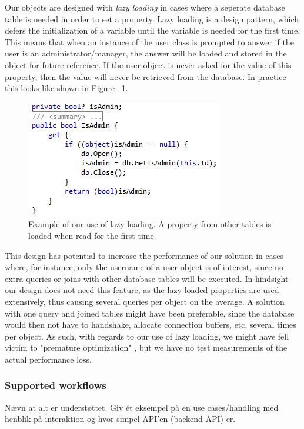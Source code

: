 Our objects are designed with \emph{lazy loading} in cases where a seperate database table is needed in order to set a property. Lazy loading is a design pattern, which defers the initialization of a variable until the variable is needed for the first time. This means that when an instance of the user class is prompted to answer if the user is an administrator/manager, the answer will be loaded and stored in the object for future reference. If the user object is never asked for the value of this property, then the value will never be retrieved from the database. In practice this looks like shown in Figure ~\ref{fig:lazyload}.

\begin{figure}[h]
	\centering
	\includegraphics[scale=1]{./p1design/lazyload.png}
	\caption{Example of our use of lazy loading. A property from other tables is loaded when read for the first time.}
	\label{fig:lazyload}
\end{figure}


This design has potential to increase the performance of our solution in cases where, for instance, only the username of a user object is of interest, since no extra queries or joins with other database tables will be executed. In hindsight our design does not need this feature, as the lazy loaded properties are used extensively, thus causing several queries per object on the average. A solution with one query and joined tables might have been preferable, since the database would then not have to handshake, allocate connection buffers, etc. several times per object. As such, with regards to our use of lazy loading, we might have fell victim to "premature optimization" \cite{premoptim}, but we have no test measurements of the actual performance loss.


\subsubsection{Supported workflows}
Nævn at alt er understøttet.
Giv ét eksempel på en use cases/handling med henblik på interaktion og hvor simpel API'en (backend API) er.